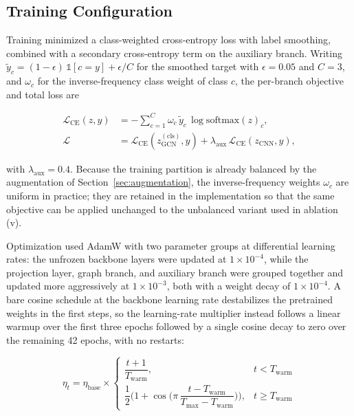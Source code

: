 \documentclass[journal]{IEEEtran}
\begin{document}
\subsection{Training Configuration}
\label{sec:training}
Training minimized a class-weighted cross-entropy loss with label smoothing,
combined with a secondary cross-entropy term on the auxiliary branch. Writing
$\tilde{y}_c = (1-\epsilon)\,\mathbb{1}[c = y] + \epsilon/C$ for the smoothed
target with $\epsilon = 0.05$ and $C = 3$, and $\omega_c$ for the
inverse-frequency class weight of class $c$, the per-branch objective and total
loss are

\begingroup
\small
\begin{equation}
\label{eq:loss}
\begin{aligned}
\mathcal{L}_{\text{CE}}(z, y) &= -\sum_{c=1}^{C} \omega_c\,\tilde{y}_c\,
\log \mathrm{softmax}(z)_c, \\
\mathcal{L} &= \mathcal{L}_{\text{CE}}(z_{\text{GCN}}^{(\text{cls})}, y)
+ \lambda_{\text{aux}}\,\mathcal{L}_{\text{CE}}(z_{\text{CNN}}, y),
\end{aligned}
\end{equation}
\endgroup

with $\lambda_{\text{aux}} = 0.4$. Because the training partition is already
balanced by the augmentation of Section~\ref{sec:augmentation}, the
inverse-frequency weights $\omega_c$ are uniform in practice; they are retained
in the implementation so that the same objective can be applied unchanged to the
unbalanced variant used in ablation (v).

Optimization used AdamW \cite{loshchilov2019decoupled} with two parameter groups
at differential learning rates: the unfrozen backbone layers were updated at
$1 \times 10^{-4}$, while the projection layer, graph branch, and auxiliary
branch were grouped together and updated more aggressively at
$1 \times 10^{-3}$, both with a weight decay of $1 \times 10^{-4}$. A bare
cosine schedule at the backbone learning rate destabilizes the pretrained
weights in the first steps, so the learning-rate multiplier instead follows a
linear warmup over the first three epochs followed by a single cosine decay to
zero over the remaining 42 epochs, with no restarts:

\begingroup
\small
\begin{equation}
\label{eq:schedule}
\eta_t = \eta_{\text{base}} \times
\begin{cases}
\dfrac{t+1}{T_{\text{warm}}}, & t < T_{\text{warm}} \\[6pt]
\dfrac{1}{2}\Big(1+\cos\Big(\pi\,\dfrac{t-T_{\text{warm}}}
{T_{\max}-T_{\text{warm}}}\Big)\Big), & t \geq T_{\text{warm}}
\end{cases}
\end{equation}
\endgroup
\end{document}
